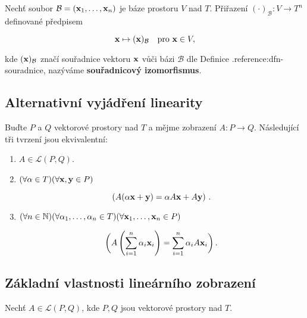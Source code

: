 Nechť soubor $\mathcal B=(\mathbf{x}_1,\dots,\mathbf{x}_n)$ je báze prostoru $V$ nad $T$.
Přiřazení $(\cdot)_{\mathcal B}:V\to T^n$ definované předpisem

\[ \mathbf{x}\mapsto (\mathbf{x})_{\mathcal B} \quad \text{pro } \mathbf{x}\in V, \]

\noindent kde $(\mathbf{x})_{\mathcal B}$ značí souřadnice vektoru $\mathbf{x}$ vůči bázi $\mathcal B$
dle Definice .reference:dfn-souradnice, nazýváme \textbf{souřadnicový
      izomorfismus}.

\subsection*{Alternativní vyjádření linearity}

Buďte $P$ a $Q$ vektorové prostory nad $T$ a mějme zobrazení $A:P\rightarrow
      Q$. Následující tři tvrzení jsou ekvivalentní:

\begin{enumerate}
      \item $A\in\mathcal L(P,Q)$.
      \item $(\forall \alpha\in T)(\forall \mathbf{x},\mathbf{y}\in P)$

            \[ \left(A(\alpha \mathbf{x}+ \mathbf{y})=\alpha A\mathbf{x}+ A\mathbf{y}\right)\,. \]

      \item $(\forall n\in\mathbb{N})(\forall \alpha_{1},\dots,\alpha_{n}\in T)(\forall \mathbf{x}_{1},\dots, \mathbf{x}_{n}\in P)$

            \[ \bigg(A\left(\sum_{i=1}^{n}\alpha_{i}\mathbf{x}_{i}\right)=\sum_{i=1}^{n}\alpha_{i}A\mathbf{x}_{i}\bigg)\,. \]

\end{enumerate}

\subsection*{Základní vlastnosti lineárního zobrazení}

Nechť $A\in\mathcal L(P,Q)$, kde $P,Q$ jsou vektorové prostory nad $T$.

